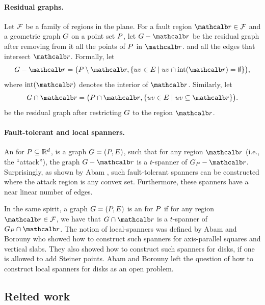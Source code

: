 \documentclass[12pt]{article}%
\begin{document}
\paragraph{Residual graphs.}

Let $\mathcal{F}$ be a family of regions in the plane. For a fault region
$\region \in \FF$ and a geometric graph $G$ on a point set $P$, let
$\G \gminus \region$ be the residual graph after removing from it all
the points of $P$ in $\region$. and all the edges that intersect
$\region$.  Formally, let
\begin{equation*}
    \G \gminus \region%
    =%
    \bigl( \PS \setminus \region, \Set{ uv \in \EG }{ uv \cap
       \interiorX{\region} = \emptyset} \bigr),
\end{equation*}
where $\interiorX{\region}$ denotes the interior of
$\region$. Similarly, let
\begin{equation*}
    \restrictY{\G}{\region}%
    =%
    \bigl( \PS \cap {\region},
    \Set{uv \in \EG}{ uv \subseteq {\region} } \bigr).
\end{equation*}
be the residual graph after restricting $G$ to the region $\region$.

\paragraph{Fault-tolerant and local spanners.}

An  for $P\subseteq \mathbb{R}^d$, is a graph $G=(P, E)$, such that
for any region $\region$ (i.e., the ``attack''), the graph
$\G \gminus \region$ is a $t$-spanner of $\G_\PS - \region$. Surprisingly, as shown by Abam \etal \cite{abfg-rftgs-09},
such fault-tolerant spanners can be constructed where the  attack
region is any convex set. Furthermore, these spanners have a near linear
number of edges.

In the same spirit, a graph $G=(P, E)$ is an  for $P$
if for any region $\region \in \FF$, we have that
$\restrictY{\G}{\region}$ is a $t$-spanner of $\G_\PS \cap \region$.  The
notion of local-spanners was defined by Abam and Borouny
\cite{ab-lgs-21} who showed how to construct such spanners for
axis-parallel squares and vertical slabs. They also showed how to
construct such spanners for disks, if one is allowed to add Steiner
points. Abam and Borouny left the question of how to construct local
spanners for disks as an open problem.

\subsection*{Relted work}
\end{document}
